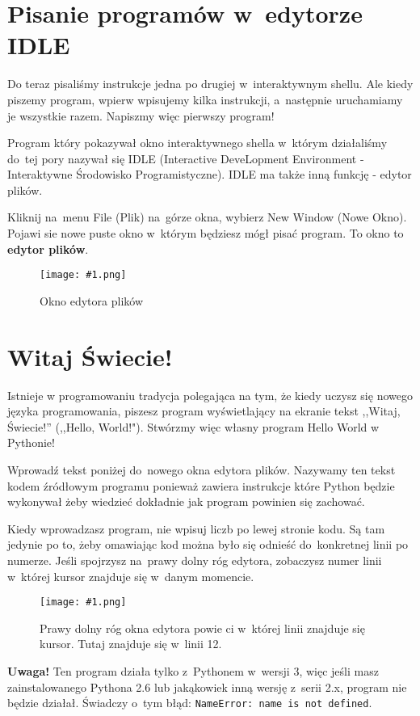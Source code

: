 \documentclass{book}
\newcommand{\img}[3]{
\begin{figure}
\centerline{
	\texttt{[image: \#1.png]}
}
\caption{#2}
\label{#1}
\end{figure}
}
\begin{document}
\section{Pisanie programów w~edytorze IDLE}

Do teraz pisaliśmy instrukcje jedna po drugiej w~interaktywnym shellu. Ale kiedy piszemy program, wpierw wpisujemy kilka instrukcji, a~następnie uruchamiamy je wszystkie razem. Napiszmy więc pierwszy program!

Program który pokazywał okno interaktywnego shella w~którym działaliśmy do~tej pory nazywał się IDLE (Interactive DeveLopment Environment - Interaktywne Środowisko Programistyczne). IDLE ma także inną funkcję - edytor plików.

Kliknij na~menu File (Plik) na~górze okna, wybierz New Window (Nowe Okno). Pojawi sie nowe puste okno w~którym będziesz mógł pisać program. To okno to {\bf edytor plików}.

\img{strings-fileeditor}{Okno edytora plików}{7 cm}

\section{Witaj Świecie!}

Istnieje w programowaniu tradycja polegająca na tym, że kiedy uczysz się nowego języka programowania, piszesz program wyświetlający na ekranie tekst ,,Witaj, Świecie!'' (,,Hello, World!"). Stwórzmy więc własny program Hello World w Pythonie!

Wprowadź tekst poniżej do~nowego okna edytora plików. Nazywamy ten tekst kodem źródłowym programu ponieważ zawiera instrukcje które Python będzie wykonywał żeby wiedzieć dokładnie jak program powinien się zachować.

Kiedy wprowadzasz program, nie wpisuj liczb po lewej stronie kodu. Są tam jedynie po to, żeby omawiając kod można było się odnieść do~konkretnej linii po numerze. Jeśli spojrzysz na~prawy dolny róg edytora, zobaczysz numer linii w~której kursor znajduje się w~danym momencie.

\img{strings-nrlinii}{Prawy dolny róg okna edytora powie ci w~której linii znajduje się kursor. Tutaj znajduje się w~linii 12.}{3 cm}


{\bf Uwaga!} Ten program działa tylko z~Pythonem w~wersji 3, więc jeśli masz zainstalowanego Pythona 2.6 lub jakąkowiek inną wersję z~serii 2.x, program nie będzie działał. Świadczy o~tym błąd: \lstinline{NameError: name is not defined}.
\end{document}
